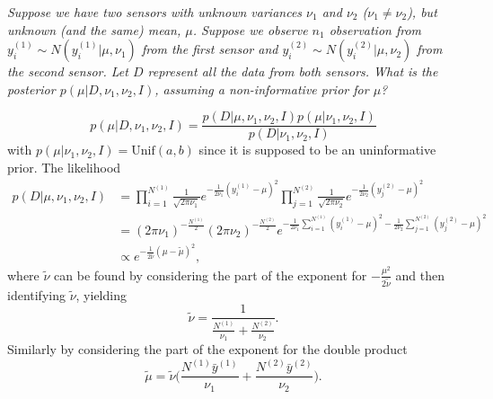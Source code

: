 \begin{example}
	\emph{Suppose we have two sensors with unknown variances $\nu_1$ and $\nu_2$ ($\nu_1\neq \nu_2$), but unknown (and the same) mean, $\mu$. Suppose we observe $n_1$ observation from $y_i^{(1)}\sim N(y_i^{(1)}|\mu,\nu_1)$ from the first sensor and $y_i^{(2)}\sim N(y_i^{(2)}|\mu,\nu_2)$ from the second sensor. Let $D$ represent all the data from both sensors. What is the posterior $p(\mu|D,\nu_1,\nu_2,I)$, assuming a non-informative prior for $\mu$?}
	
	\begin{equation}
		p(\mu|D,\nu_1,\nu_2,I) =\frac{p(D|\mu,\nu_1,\nu_2,I)p(\mu|\nu_1,\nu_2,I)}{p(D|\nu_1,\nu_2,I)}
	\end{equation}
	with $p(\mu|\nu_1,\nu_2,I)=\text{Unif}(a,b)$ since it is supposed to be an uninformative prior. The likelihood 
	\begin{equation}
		\begin{split}
			p(D|\mu,\nu_1,\nu_2,I) &= \prod_{i=1}^{N^{(1)}}\frac{1}{\sqrt{2\pi \nu_1}}e^{-\frac{1}{2\nu_1}(y_i^{(1)}-\mu)^2}\prod_{j=1}^{N^{(2)}}\frac{1}{\sqrt{2\pi \nu_2}}e^{-\frac{1}{2\nu_2}(y_j^{(2)}-\mu)^2}\\
			& = (2\pi \nu_1)^{-\frac{N^{(1)}}{2}}(2\pi \nu_2)^{-\frac{N^{(2)}}{2}}e^{-\frac{1}{2\nu_1}\sum_{i=1}^{N^{(1)}}(y_i^{(1)}-\mu)^2-\frac{1}{2\nu_2}\sum_{j=1}^{N^{(2)}}(y_j^{(2)}-\mu)^2}\\
			&\propto e^{-\frac{1}{2\tilde{\nu}}(\mu-\tilde{\mu})^2},
		\end{split}
	\end{equation}
	where $\tilde{\nu}$ can be found by considering the part of the exponent for $-\frac{\mu^2}{2\tilde{\nu}}$ and then identifying $\tilde{\nu}$, yielding
	\begin{equation}
		\tilde{\nu}= \frac{1}{\frac{N^{(1)}}{\nu_1}+\frac{N^{(2)}}{\nu_2}}.
	\end{equation}
	Similarly by considering the part of the exponent for the double product
	\begin{equation}
		\tilde{\mu} = \tilde{\nu}\bigg(\frac{N^{(1)}\bar{y}^{(1)}}{\nu_1}+\frac{N^{(2)}\bar{y}^{(2)}}{\nu_2}\bigg).
	\end{equation}
\end{example}


